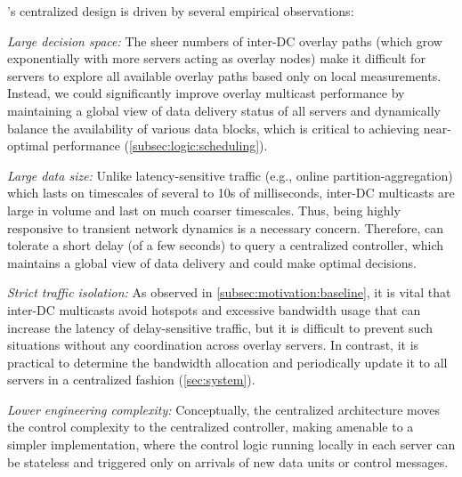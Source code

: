 \name's centralized design is driven by several empirical observations:
\begin{packedenumerate}

\item {\em Large decision space:}
The sheer numbers of inter-DC overlay paths
(which grow exponentially with more servers acting as overlay nodes)
make it difficult for servers to explore all available overlay
paths based only on local measurements.
Instead, we could significantly improve overlay multicast
performance by maintaining a global view of data delivery
status of all servers and dynamically balance
the availability of
various data blocks, which
is critical to achieving near-optimal performance
(\Section\ref{subsec:logic:scheduling}).

\item {\em Large data size:}
Unlike latency-sensitive traffic
(e.g., online partition-aggregation) which lasts on timescales
of several to 10s of milliseconds, inter-DC multicasts are large in volume and
last on much coarser timescales.
Thus, being highly responsive to transient network dynamics is a necessary concern.
Therefore, \name can tolerate a short delay (of a few seconds) to query a 
centralized controller, which maintains a global view of data delivery
and could make optimal decisions.

\item {\em Strict traffic isolation:}
As observed in \Section\ref{subsec:motivation:baseline},
it is vital that inter-DC
multicasts avoid hotspots and excessive bandwidth usage that can increase the latency of delay-sensitive traffic,
but it is difficult to prevent such situations
without any coordination across overlay servers.
In contrast, it is practical
to determine the bandwidth allocation and periodically update it
to all servers in a centralized fashion (\Section\ref{sec:system}).

\item {\em Lower engineering complexity:}
Conceptually, the centralized architecture moves the control complexity to
the centralized controller, making \name amenable to a simpler implementation,
where the control logic running locally in each server can be stateless and
triggered only on arrivals of new data units or control messages.

\end{packedenumerate}

